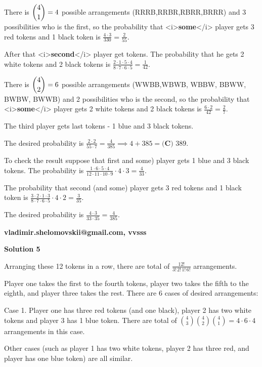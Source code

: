 \begin{enumerate}
 There is  $\dbinom41 = 4$ possible arrangements (RRRB,RRBR,RBRR,BRRR) and 3 possibilities who is the first, so the probability that <i>\textbf{some}</i> player gets 3 red tokens and 1 black token is $\frac {4 \cdot 3}{330} = \frac {2}{55}.$ 

 After that <i>\textbf{second}</i> player get tokens. The probability that he gets 2 white tokens and 2 black tokens is $\frac{2 \cdot 1 \cdot 5 \cdot 4}{8 \cdot 7 \cdot 6 \cdot 5} = \frac {1}{42}.$

 There is $\dbinom42 = 6$ possible arrangements (WWBB,WBWB, WBBW, BBWW, BWBW, BWWB) and 2 possibilities who is the second, so the probability that <i>\textbf{some}</i> player gets 2 white tokens and 2 black tokens is $\frac {6 \cdot 2}{42} = \frac {2}{7}.$

 The third player gets last tokens - 1 blue and 3 black tokens.

 The desired probability is $\frac {2 \cdot 2}{55 \cdot 7} = \frac {4}{385} \implies 4+385=\boxed{\textbf{(C) }389}$.

 To check the result suppose that first and some) player gets 1 blue and 3 black tokens. The probability is $\frac{1 \cdot 6 \cdot 5 \cdot 4}{12 \cdot 11 \cdot 10 \cdot 9} \cdot 4 \cdot 3 = \frac {4}{33}.$ 

 The probability that second (and some) player gets 3 red tokens and 1 black token is $\frac{3 \cdot 2 \cdot 1 \cdot 3}{8 \cdot 7 \cdot 6 \cdot 5} \cdot 4 \cdot 2 = \frac {3}{35}.$

 The desired probability is $\frac {4 \cdot 3}{33 \cdot 35} = \frac {4}{385}.$

 
\textbf{vladimir.shelomovskii@gmail.com, vvsss}

 



\textbf{Solution 5}

Arranging these 12 tokens in a row, there are total of $\frac{12!}{3!\,2!\,1!\,6!}$ arrangements. 

 Player one takes the first to the fourth tokens, player two takes the fifth to the eighth, and player three takes the rest. There are 6 cases of desired arrangements:

 Case 1. Player one has three red tokens (and one black), player 2 has two white tokens and player 3 has 1 blue token. There are total of $\binom{4}{3}\binom{4}{2}\binom{4}{1}=4\cdot 6\cdot 4$ arrangements in this case.

 Other cases (such as player 1 has two white tokens, player 2 has three red, and player has one blue token) are all similar.


\end{enumerate}
